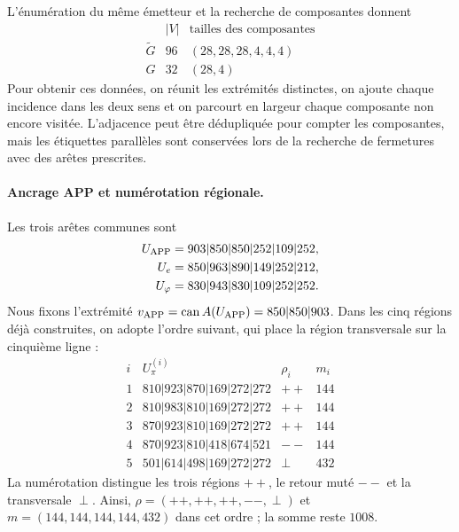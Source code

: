 L'énumération du même émetteur et la recherche de composantes donnent
\begin{equation}
\begin{array}{c|r|l}
 & |V|&\text{tailles des composantes}\\ \hline
 \widetilde G&96&(28,28,28,4,4,4)\\
 G&32&(28,4)
\end{array}
\label{regcl27:componentes}
\end{equation}
Pour obtenir ces données, on réunit les extrémités distinctes, on ajoute
chaque incidence dans les deux sens et on parcourt en largeur chaque
composante non encore visitée. L'adjacence peut être dédupliquée pour compter les
composantes, mais les étiquettes parallèles sont conservées lors de la recherche de fermetures
avec des arêtes prescrites.

\paragraph{Ancrage APP et numérotation régionale.}
Les trois arêtes communes sont
\begin{equation}
\begin{aligned}
 U_{\rm APP}&=903|850|850|252|109|252,\\
 U_e&=850|963|890|149|252|212,\\
 U_\varphi&=830|943|830|109|252|252.
\end{aligned}
\label{regcl27:anclajes}
\end{equation}
Nous fixons l'extrémité \(v_{\rm APP}=\operatorname{can}A(U_{\rm APP})=850|850|903\). Dans les cinq régions déjà construites, on adopte l'ordre suivant, qui place la région transversale sur la cinquième ligne :
\begin{equation}
\begin{array}{c|l|c|r}
 i&U_\pi^{(i)}&\rho_i&m_i\\ \hline
 1&810|923|870|169|272|272&++&144\\
 2&810|983|810|169|272|272&++&144\\
 3&870|923|810|169|272|272&++&144\\
 4&870|923|810|418|674|521&--&144\\
 5&501|614|498|169|272|272&\perp&432
\end{array}
\label{regcl27:regiones}
\end{equation}
La numérotation distingue les trois régions \(++\), le retour muté
\( -- \) et la transversale \(\perp\). Ainsi,
\(\rho=(++ ,++ ,++ ,--,\perp)\) et
\(m=(144,144,144,144,432)\) dans cet ordre ; la somme reste \(1008\).

